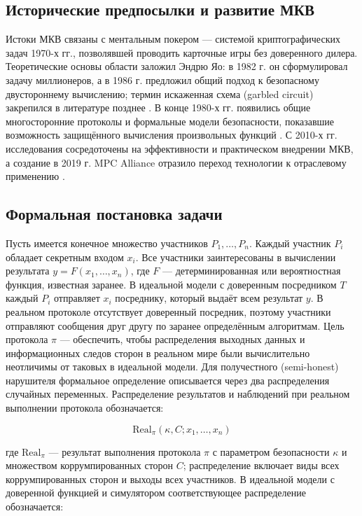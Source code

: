 \subsection{Исторические предпосылки и развитие МКВ}

Истоки МКВ связаны с ментальным покером --- системой криптографических задач 1970-х гг., позволявшей проводить карточные игры без доверенного дилера. Теоретические основы области заложил Эндрю Яо: в 1982 г. он сформулировал задачу миллионеров, а в 1986 г. предложил общий подход к безопасному двустороннему вычислению; термин искаженная схема (garbled circuit) закрепился в литературе позднее \cite{14, 15, 16}. В конце 1980-х гг. появились общие многосторонние протоколы и формальные модели безопасности, показавшие возможность защищённого вычисления произвольных функций \cite{06, 08}. С 2010-х гг. исследования сосредоточены на эффективности и практическом внедрении МКВ, а создание в 2019 г. MPC Alliance отразило переход технологии к отраслевому применению \cite{19}.

\subsection{Формальная постановка задачи}

Пусть имеется конечное множество участников \(P_{1},\ldots,P_{n}\). Каждый участник \(P_{i}\) обладает секретным входом \(x_{i}\). Все участники заинтересованы в вычислении результата \(y=F(x_{1},\ldots,x_{n})\), где \(F\) --- детерминированная или вероятностная функция, известная заранее. В идеальной модели с доверенным посредником \(T\) каждый \(P_{i}\) отправляет \(x_{i}\) посреднику, который выдаёт всем результат \(y\). В реальном протоколе отсутствует доверенный посредник, поэтому участники отправляют сообщения друг другу по заранее определённым алгоритмам. Цель протокола \(\pi\) --- обеспечить, чтобы распределения выходных данных и информационных следов сторон в реальном мире были вычислительно неотличимы от таковых в идеальной модели. Для получестного (semi-\allowbreak honest) нарушителя формальное определение описывается через два распределения случайных переменных. Распределение результатов и наблюдений при реальном выполнении протокола обозначается:

\begin{equation}
\mathrm{Real}_{\pi}(\kappa, C; x_{1},\ldots,x_{n})
\end{equation}

где \(\mathrm{Real}_{\pi}\) --- результат выполнения протокола \(\pi\) с параметром безопасности \(\kappa\) и множеством коррумпированных сторон \(C\); распределение включает виды всех коррумпированных сторон и выходы всех участников. В идеальной модели с доверенной функцией и симулятором соответствующее распределение обозначается:

